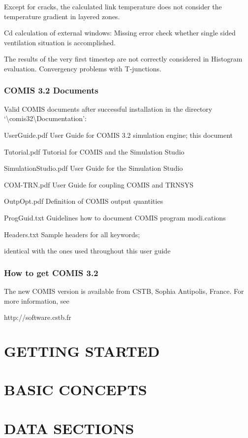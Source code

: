 \documentclass[10pt]{book}
\begin{document}
Except for cracks, the calculated link temperature does not consider the temperature gradient in layered zones. 

Cd calculation of external windows: Missing error check whether single sided ventilation situation is accomplished.

The results of the very first timestep are not correctly considered in Histogram evaluation. 
Convergency problems with T-junctions. 


\subsection{COMIS 3.2 Documents}

Valid COMIS documents after successful installation in the directory `\textbackslash comis32\textbackslash Documentation':

UserGuide.pdf  User Guide for COMIS 3.2 simulation engine; this document

Tutorial.pdf  Tutorial for COMIS and the Simulation Studio

SimulationStudio.pdf  User Guide for the Simulation Studio

COM-TRN.pdf  User Guide for coupling COMIS and TRNSYS

OutpOpt.pdf  Definition of COMIS output quantities

ProgGuid.txt  Guidelines how to document COMIS program modi.cations

Headers.txt  Sample headers for all keywords;

identical with the ones used throughout this user guide

\subsection{How to get COMIS 3.2}

The new COMIS version is available from CSTB, Sophia Antipolis, France. For more information, see

http://software.cstb.fr

\chapter{GETTING STARTED}

\chapter{BASIC CONCEPTS}

\chapter{DATA SECTIONS}
\end{document}
